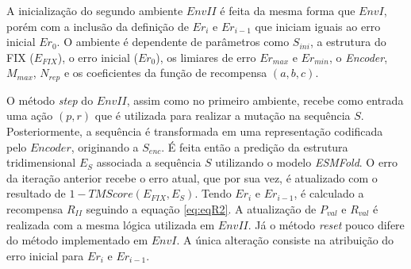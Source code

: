 A inicialização do segundo ambiente $EnvII$ é feita da mesma forma que $EnvI$, porém com a inclusão da definição de $Er_{i}$ e $Er_{i-1}$ que 
iniciam iguais ao erro inicial $Er_{0}$. O ambiente é dependente de parâmetros como $S_{ini}$, a estrutura do FIX 
($E_{FIX}$), o erro inicial ($Er_{0}$), os limiares de erro $Er_{max}$ e $Er_{min}$, o \textit{Encoder},
$M_{max}$, $N_{rep}$ e os coeficientes da função de recompensa $(a, b, c)$.

O método \textit{step} do $EnvII$, assim como no primeiro ambiente, recebe como entrada uma ação $(p, r)$
que é utilizada para realizar a mutação na sequência $S$. 
Posteriormente, a sequência é transformada
em uma representação codificada pelo $Encoder$, originando a $S_{enc}$.
É feita então a predição da estrutura tridimensional $E_S$ associada a sequência $S$ utilizando o modelo \textit{ESMFold}.
O erro da iteração anterior recebe o erro atual, que por sua vez, é atualizado com o resultado de $1-TMScore(E_{FIX}, E_{S})$.
Tendo $Er_{i}$ e $Er_{i-1}$, é calculado a recompensa $R_{II}$ seguindo a equação \ref{eq:eqR2}.
A atualização de $P_{val}$ e $R_{val}$ é realizada com a mesma lógica utilizada em $EnvII$.
Já o método \textit{reset} pouco difere do método implementado em $EnvI$. A única alteração consiste na atribuição do erro inicial 
para $Er_{i}$ e $Er_{i-1}$.


